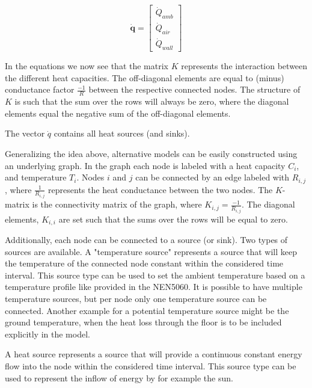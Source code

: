 \begin{equation}
	\mathbf{\dot{q}} =
	\begin{bmatrix}
		\dot{Q}_{amb}\\
		\dot{Q}_{air} \\
		\dot{Q}_{wall} 
	\end{bmatrix}
\end{equation}

In the equations we now see that the matrix $K$ represents the interaction between the different heat capacities.  The off-diagonal elements are equal to (minus) conductance factor $\frac{-1}{R}$ between the respective connected nodes. The structure of $K$ is such that the sum over the rows will always be zero, where the diagonal elements equal the negative sum of the off-diagonal elements.

The vector $\dot{q}$ contains all heat sources (and sinks). 

Generalizing the idea above, alternative models can be easily constructed using an underlying graph. In the graph each node is labeled with a heat capacity $C_i$, and temperature $T_i$. Nodes $i$ and $j$ can be connected by an edge labeled with $R_{i,j}$, where $\frac{1}{R_{i,j}}$ represents the heat conductance between the two nodes. The $K$-matrix is the connectivity matrix of the graph, where $K_{i,j} = \frac{-1}{R_{i,j}}$. The diagonal elements, $K_{i,i}$ are set such that the sums over the rows will be equal to zero.
 

Additionally, each node can be connected to a source (or sink). Two types of sources are available. A "temperature source" represents a source that will keep the temperature of the connected node constant within the considered time interval. This source type can be used to set the ambient temperature based on a temperature profile like provided in the NEN5060. It is possible to have multiple temperature sources, but per node only one temperature source can be connected. Another example for a potential temperature source might be the ground temperature, when the heat loss through the floor is to be included explicitly in the model.    

A heat source represents a source that will provide a continuous constant energy flow into the node within the considered time interval. This source type can be used to represent the inflow of energy by for example the sun. 

